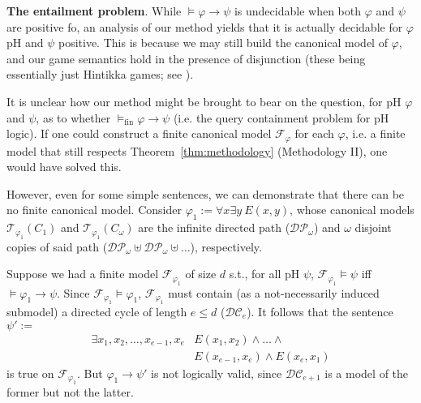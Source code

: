 \documentclass{LMCS}
\begin{document}
\textbf{The entailment problem}.
While $\models \varphi \rightarrow \psi$ is undecidable when both $\varphi$ and $\psi$ are positive fo, an analysis of our method yields that it is actually decidable for $\varphi$ pH and $\psi$ positive. This is because we may still build the canonical model of $\varphi$, and our game semantics hold in the presence of disjunction (these being essentially just Hintikka games; see \cite{Hodges}).

It is unclear how our method might be brought to bear on the question, for pH $\varphi$ and $\psi$, as to whether $\models_\mathrm{fin} \varphi \rightarrow \psi$ (\mbox{i.e.} the query containment problem for pH logic). If one could construct a finite canonical model $\mathcal{F}_\varphi$ for each $\varphi$, i.e. a finite model that still respects Theorem~\ref{thm:methodology} (Methodology II), one would have solved this. 


However, even for some simple sentences, we can demonstrate that there can be no finite canonical model. Consider $\varphi_1:= \forall x \exists y \ E(x,y)$, whose canonical models $\mathcal{T}_{\varphi_1}(C_1)$ and $\mathcal{T}_{\varphi_1}(C_\omega)$ are the infinite directed path ($\mathcal{DP}_\omega$) and $\omega$ disjoint copies of said path ($\mathcal{DP}_\omega \uplus \mathcal{DP}_\omega \uplus \ldots$), respectively. 

Suppose we had a finite model $\mathcal{F}_{\varphi_1}$ of size $d$ s.t., for all pH $\psi$, $\mathcal{F}_{\varphi_1} \models \psi$ iff $\models \varphi_1 \rightarrow \psi$. Since $\mathcal{F}_{\varphi_1} \models \varphi_1$, $\mathcal{F}_{\varphi_1}$ must contain (as a not-necessarily induced submodel) a directed cycle of length $e \leq d$ ($\mathcal{DC}_e$). It follows that the sentence $ \psi' :=$ 
\[
\begin{array}{ll}
\exists x_1,x_2,\ldots,x_{e-1},x_{e} & E(x_1,x_2) \wedge \ldots \wedge \\
& E(x_{e-1},x_{e}) \wedge E(x_{e},x_{1}) 
\end{array}
\]
is true on $\mathcal{F}_{\varphi_1}$. But $\varphi_1 \rightarrow \psi'$ is not logically valid, since $\mathcal{DC}_{e+1}$ is a model of the former but not the latter.
\end{document}
